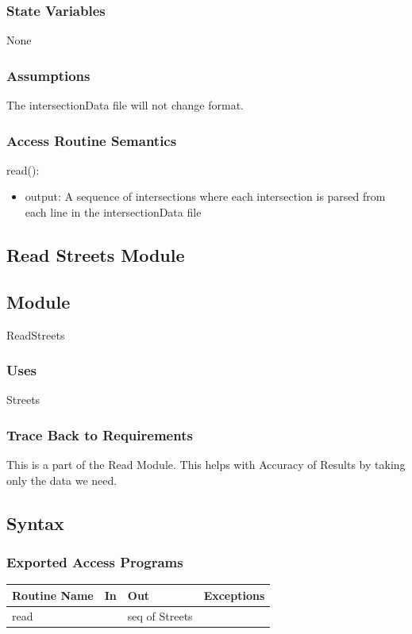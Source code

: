\documentclass[12pt]{article}
\begin{document}
\subsubsection*{State Variables}
None

\subsubsection*{Assumptions}
The intersectionData file will not change format.

\subsubsection*{Access Routine Semantics}

read():
\begin{itemize}
    \item output: A sequence of intersections where each intersection is parsed from each line in the intersectionData file
\end{itemize}

\newpage
\subsection{Read Streets Module}
\subsection*{Module}
ReadStreets

\subsubsection*{Uses}
Streets

\subsubsection*{Trace Back to Requirements}
This is a part of the Read Module. This helps with Accuracy of Results by taking only the data we need.

\subsection*{Syntax}
\subsubsection*{Exported Access Programs}
    \begin{tabular}{|l|l|l|l|}
    \hline
    \textbf{Routine Name} & \textbf{In} & \textbf{Out} & \textbf{Exceptions}\\
    \hline
    read & ~ & seq of Streets & ~\\
    \hline
    \end{tabular}
    
\end{document}
